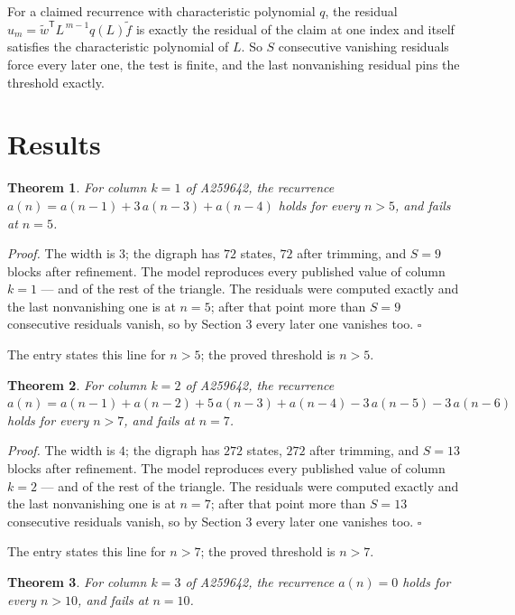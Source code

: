 \documentclass[11pt]{article}
\newtheorem{theorem}{Theorem}
\theoremstyle{definition}
\begin{document}
For a claimed recurrence with characteristic polynomial $q$, the residual $u_m = \tilde w^{\mathsf T}L^{\,m-1}q(L)\tilde f$ is exactly the residual of the claim at one index and itself satisfies the characteristic polynomial of $L$. So $S$ consecutive vanishing residuals force every later one, the test is finite, and the last nonvanishing residual pins the threshold exactly.

\section{Results}

\begin{theorem} For column $k = 1$ of A259642, the recurrence $a(n) = a(n-1) + 3\,a(n-3) + a(n-4)$ holds for every $n > 5$, and fails at $n = 5$.\end{theorem}

{\itshape Proof.} The width is $3$; the digraph has $72$ states, $72$ after trimming, and $S = 9$ blocks after refinement. The model reproduces every published value of column $k = 1$ --- and of the rest of the triangle. The residuals were computed exactly and the last nonvanishing one is at $n = 5$; after that point more than $S = 9$ consecutive residuals vanish, so by Section 3 every later one vanishes too. $\square$

The entry states this line for $n > 5$; the proved threshold is $n > 5$.

\begin{theorem} For column $k = 2$ of A259642, the recurrence $a(n) = a(n-1) + a(n-2) + 5\,a(n-3) + a(n-4) - 3\,a(n-5) - 3\,a(n-6)$ holds for every $n > 7$, and fails at $n = 7$.\end{theorem}

{\itshape Proof.} The width is $4$; the digraph has $272$ states, $272$ after trimming, and $S = 13$ blocks after refinement. The model reproduces every published value of column $k = 2$ --- and of the rest of the triangle. The residuals were computed exactly and the last nonvanishing one is at $n = 7$; after that point more than $S = 13$ consecutive residuals vanish, so by Section 3 every later one vanishes too. $\square$

The entry states this line for $n > 7$; the proved threshold is $n > 7$.

\begin{theorem} For column $k = 3$ of A259642, the recurrence $a(n) = 0$ holds for every $n > 10$, and fails at $n = 10$.\end{theorem}
\end{document}
